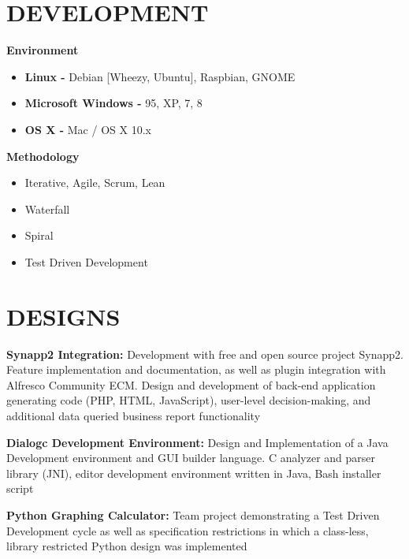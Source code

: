 \documentclass[line, margin]{res}
\begin{document}
\begin{resume}
\section{DEVELOPMENT}
{
	\textbf{Environment}\\
\begin{itemize}
	\item \textbf{Linux - }{\color{darkgrey}Debian [Wheezy, Ubuntu], Raspbian, GNOME}
	\item \textbf{Microsoft Windows - }{\color{darkgrey}95, XP, 7, 8}
	\item \textbf{OS X - }{\color{darkgrey}Mac / OS X 10.x}
\end{itemize}
	\textbf{Methodology}\\
\begin{itemize}
	\item {\color{darkgrey}Iterative, Agile, Scrum, Lean}
	\item {\color{darkgrey}Waterfall}
	\item {\color{darkgrey}Spiral}
	\item {\color{darkgrey}Test Driven Development}\\
\end{itemize}
}

\section{DESIGNS}
{
	\textbf{Synapp2 Integration: }{\color{darkgrey}Development with free and open source project Synapp2. Feature implementation and documentation, as well as plugin integration with Alfresco Community ECM. Design and development of back-end application generating code (PHP, HTML, JavaScript), user-level decision-making, and additional data queried business report functionality}

	\textbf{Dialogc Development Environment: }{\color{darkgrey}Design and Implementation of a Java Development environment and GUI builder language. C analyzer and parser library (JNI), editor development environment written in Java, Bash installer script}

	\textbf{Python Graphing Calculator: }{\color{darkgrey}Team project demonstrating a Test Driven Development cycle as well as specification restrictions in which a class-less, library restricted Python design was implemented}
}
\end{resume}
\clearpage
\end{document}
